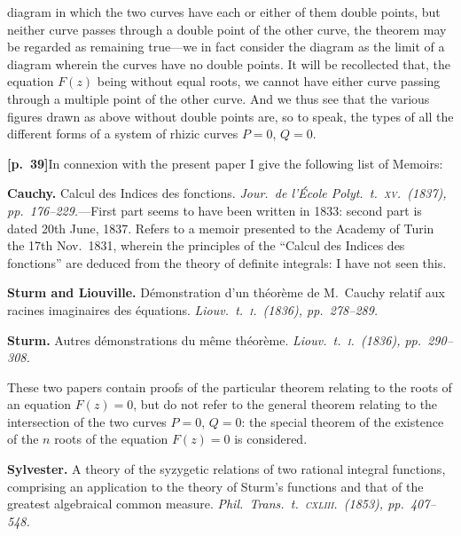 \documentclass[11pt,a4paper]{article}
\begin{document}
diagram in which the two curves have each or either of them double points, but neither curve passes through a double point of the other curve, the theorem may be regarded as remaining true---we in fact consider the diagram as the limit of a diagram wherein the curves have no double points. It will be recollected that, the equation $F(z)$ being without equal roots, we cannot have either curve passing through a multiple point of the other curve. And we thus see that the various figures drawn as above without double points are, so to speak, the types of all the different forms of a system of rhizic curves $P=0$, $Q=0$.

\bigskip

\noindent\textbf{[p.~39]}\quad In connexion with the present paper I give the following list of Memoirs:

\medskip

\noindent\textbf{Cauchy.} Calcul des Indices des fonctions. \textit{Jour.\ de l'\'Ecole Polyt.\ t.\ \textsc{xv}.\ (1837), pp.~176--229.}---First part seems to have been written in 1833: second part is dated 20th June, 1837. Refers to a memoir presented to the Academy of Turin the 17th Nov.\ 1831, wherein the principles of the ``Calcul des Indices des fonctions'' are deduced from the theory of definite integrals: I have not seen this.

\medskip

\noindent\textbf{Sturm and Liouville.} D\'emonstration d'un th\'eor\`eme de M.\ Cauchy relatif aux racines imaginaires des \'equations. \textit{Liouv.\ t.\ \textsc{i}.\ (1836), pp.~278--289.}

\medskip

\noindent\textbf{Sturm.} Autres d\'emonstrations du m\^eme th\'eor\`eme. \textit{Liouv.\ t.\ \textsc{i}.\ (1836), pp.~290--308.}

These two papers contain proofs of the particular theorem relating to the roots of an equation $F(z)=0$, but do not refer to the general theorem relating to the intersection of the two curves $P=0$, $Q=0$: the special theorem of the existence of the $n$ roots of the equation $F(z)=0$ is considered.

\medskip

\noindent\textbf{Sylvester.} A theory of the syzygetic relations of two rational integral functions, comprising an application to the theory of Sturm's functions and that of the greatest algebraical common measure. \textit{Phil.\ Trans.\ t.\ \textsc{cxliii}.\ (1853), pp.~407--548.}
\end{document}
